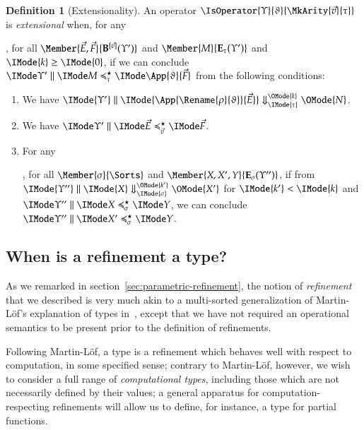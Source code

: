 \documentclass[11pt]{article}
\theoremstyle{definition}
\newtheorem{definition}[thm]{Definition}
\theoremstyle{notation}
\theoremstyle{remark}
\numberwithin{equation}{section}
\newcommand\EvalN[5]{\IMode{#1}\parallel\IMode{#4}\Downarrow^{\OMode{#3}}_{\IMode{#2}}\OMode{#5}}
\newcommand\Exprs{\mathbf{E}}
\newcommand\BTms{\mathbf{B}}
\begin{document}
\begin{definition}[Extensionality]

  An operator $\IsOperator{\Upsilon}{\vartheta}{\MkArity{\vec{v}}{\tau}}$ is
  \emph{extensional} when, for any
  , for all $\Member{\vec{E},\vec{F}}{\BTms^{[\vec{v}]}(\Upsilon')}$ and
  $\Member{M}{\Exprs_\tau(\Upsilon')}$ and $\IMode{k}\geq\IMode{0}$, if we can conclude
  $\SBinRel{\preccurlyeq^\star_\tau}{\Upsilon'}{M}{\App{\vartheta}{\vec{F}}}$
  from the following conditions:
  \begin{enumerate}
    \item
      We have $\EvalN{\Upsilon'}{\tau}{k}{\App{\Rename{\rho}{\vartheta}}{\vec{E}}}{N}$.

    \item
      We have $\SBinRel{\preccurlyeq^\star_{\vec{v}}}{\Upsilon'}{\vec{E}}{\vec{F}}$.

    \item
      For any
      , for all $\Member{\sigma}{\Sorts}$ and $\Member{X,X',Y}{\Exprs_\sigma(\Upsilon'')}$, if
      from $\EvalN{\Upsilon''}{\sigma}{k'}{X}{X'}$ for $\IMode{k'}<\IMode{k}$ and
      $\SBinRel{\preccurlyeq^\star_\sigma}{\Upsilon''}{X}{Y}$, we can conclude
      $\SBinRel{\preccurlyeq^\star_\sigma}{\Upsilon''}{X'}{Y}$.
  \end{enumerate}

\end{definition}

\subsection{When is a refinement a type?}

As we remarked in section~\ref{sec:parametric-refinement}, the notion of
\emph{refinement} that we described is very much akin to a multi-sorted
generalization of Martin-L\"of's explanation of types
in~\cite{martin-lof:1979}, except that we have not required an operational
semantics to be present prior to the definition of refinements.

Following Martin-L\"of, a type is a refinement which behaves well with respect
to computation, in some specified sense; contrary to Martin-L\"of, however, we wish to
consider a full range of \emph{computational types}, including those which are
not necessarily defined by their values; a general apparatus for
computation-respecting refinements will allow us to define, for instance, a
type for partial functions.
\end{document}
